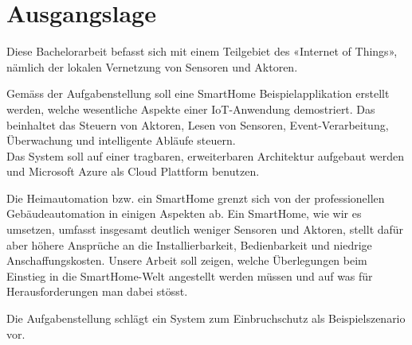 \section{Ausgangslage}
Diese Bachelorarbeit befasst sich mit einem Teilgebiet des «Internet of Things», nämlich der lokalen Vernetzung von Sensoren und Aktoren.

Gemäss der Aufgabenstellung soll eine SmartHome Beispielapplikation erstellt werden, welche wesentliche Aspekte  einer IoT-Anwendung demostriert. Das beinhaltet das Steuern von Aktoren, Lesen von Sensoren, Event-Verarbeitung, Überwachung und intelligente Abläufe steuern. \\
Das System soll auf einer tragbaren, erweiterbaren Architektur aufgebaut werden und Microsoft Azure als Cloud Plattform benutzen.

Die Heimautomation bzw. ein SmartHome grenzt sich von der professionellen Gebäudeautomation in einigen Aspekten ab. Ein SmartHome, wie wir es umsetzen, umfasst insgesamt deutlich weniger Sensoren und Aktoren, stellt dafür aber höhere Ansprüche an die Installierbarkeit, Bedienbarkeit und niedrige Anschaffungskosten. Unsere Arbeit soll zeigen, welche Überlegungen beim Einstieg in die SmartHome-Welt angestellt werden müssen und auf was für Herausforderungen man dabei stösst.

Die Aufgabenstellung schlägt ein System zum Einbruchschutz als Beispielszenario vor.


